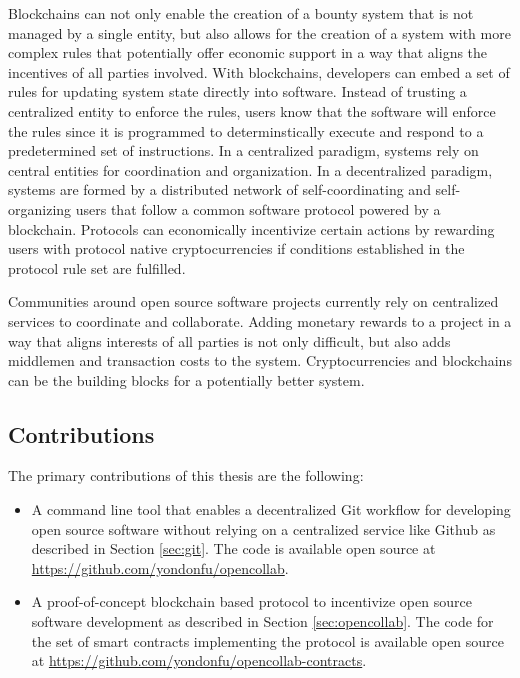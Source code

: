 Blockchains can not only enable the creation of a bounty system that is not
managed by a single entity, but also allows for the creation of a system with
more complex rules that potentially offer economic support in a way that aligns the
incentives of all parties involved. With blockchains, developers can embed a set
of rules for updating system state directly into software. Instead of trusting a
centralized entity to enforce the rules, users know that the software will
enforce the rules since it is programmed to determinstically execute and respond
to a predetermined set of instructions. In a centralized paradigm, systems rely
on central entities for coordination and organization. In a decentralized
paradigm, systems are formed by a distributed network of self-coordinating and
self-organizing users that follow a common software protocol powered by a
blockchain. Protocols can economically incentivize certain actions by rewarding
users with protocol native cryptocurrencies if conditions established in the
protocol rule set are fulfilled.

Communities around open source software projects currently rely on centralized
services to coordinate and collaborate. Adding monetary rewards to a project in
a way that aligns interests of all parties is not only difficult, but also adds
middlemen and transaction costs to the system. Cryptocurrencies and
blockchains can be the building blocks for a potentially better system.

\subsection{Contributions}

The primary contributions of this thesis are the following:

\begin{itemize}
  \item A command line tool that enables a decentralized Git workflow for
    developing open source software without relying on a centralized service
    like Github as described in Section \ref{sec:git}. The code is available
    open source at \url{https://github.com/yondonfu/opencollab}.
  \item A proof-of-concept blockchain based protocol to incentivize open source
    software development as described in Section \ref{sec:opencollab}. The code
    for the set of smart contracts implementing the protocol is available open source at \url{https://github.com/yondonfu/opencollab-contracts}.
\end{itemize}

